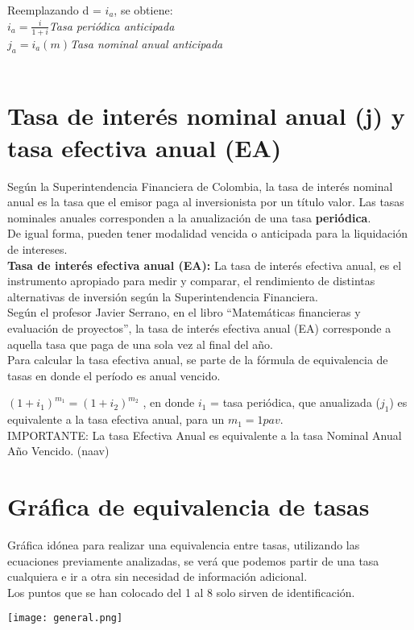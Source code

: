 Reemplazando d = $i_{a}$, se obtiene:\\

$i_{a} = \frac{i}{1+i}$\hspace{35 pt}\textit{Tasa periódica anticipada}\\
$j_{a} = i_{a}  (m)$\hspace{23 pt}\textit{Tasa nominal anual anticipada}\\\\

\section{Tasa de interés nominal anual (j) y tasa efectiva anual (EA)}
Según la Superintendencia Financiera de Colombia, la tasa de interés nominal anual es la tasa que el emisor paga al inversionista por un título valor.
Las tasas nominales anuales corresponden a la anualización de una tasa \textbf{periódica}. \\
De igual forma, pueden tener modalidad vencida o anticipada para la liquidación de intereses.\\

\textbf{Tasa de interés efectiva anual (EA):} La tasa de interés efectiva anual, es el instrumento apropiado para medir y comparar, el rendimiento de distintas alternativas de inversión según la Superintendencia Financiera.\\
Según el profesor Javier Serrano, en el libro “Matemáticas financieras y evaluación de proyectos”, la tasa de interés efectiva anual (EA) corresponde a aquella tasa que paga de una sola vez al final del año.\\

Para calcular la tasa efectiva anual, se parte de la fórmula de equivalencia de tasas en donde el
período es anual vencido.

$(1 + i_1)^{m_1} = (1 + i_2)^{m_2}$ , en donde $i_1$ = tasa periódica, que anualizada ($j_1$) es equivalente a la tasa efectiva anual, para un $m_1 = 1 pav$.\\

IMPORTANTE: La tasa Efectiva Anual es equivalente a la tasa Nominal Anual Año Vencido. (naav) \\


\section{Gráfica de equivalencia de tasas}
Gráfica idónea para realizar una equivalencia entre tasas, utilizando las ecuaciones previamente analizadas, se verá que podemos partir de una tasa cualquiera e ir a otra sin necesidad de información adicional.\\
Los puntos que se han colocado del 1 al 8 solo sirven de identificación.\\
\begin{center}
   \texttt{[image: general.png]}\\
\end{center}

